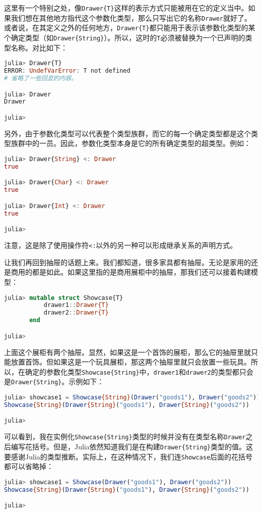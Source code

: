 这里有一个特别之处，像\verb`Drawer{T}`这样的表示方式只能被用在它的定义当中。如果我们想在其他地方指代这个参数化类型，那么只写出它的名称\verb`Drawer`就好了。或者说，在其定义之外的任何地方，\verb`Drawer{T}`都只能用于表示该参数化类型的某个确定类型（如\verb`Drawer{String}`）。所以，这时的\verb`T`必须被替换为一个已声明的类型名称。对比如下：
\begin{lstlisting}[language=julia]
julia> Drawer{T} 
ERROR: UndefVarError: T not defined
# 省略了一些回显的内容。

julia> Drawer
Drawer

julia> 
\end{lstlisting}

另外，由于参数化类型可以代表整个类型族群，而它的每一个确定类型都是这个类型族群中的一员。因此，参数化类型本身是它的所有确定类型的超类型。例如：
\begin{lstlisting}[language=julia]
julia> Drawer{String} <: Drawer
true

julia> Drawer{Char} <: Drawer
true

julia> Drawer{Int} <: Drawer
true

julia> 
\end{lstlisting}

注意，这是除了使用操作符\verb`<:`以外的另一种可以形成继承关系的声明方式。

让我们再回到抽屉的话题上来。我们都知道，很多家具都有抽屉。无论是家用的还是商用的都是如此。如果这里指的是商用展柜中的抽屉，那我们还可以接着构建模型：
\begin{lstlisting}[language=julia]
julia> mutable struct Showcase{T}
           drawer1::Drawer{T}
           drawer2::Drawer{T}
       end

julia> 
\end{lstlisting}

上面这个展柜有两个抽屉。显然，如果这是一个首饰的展柜，那么它的抽屉里就只能放置首饰。但如果这是一个玩具展柜，那这两个抽屉里就只会放置一些玩具。所以，在确定的参数化类型\verb`Showcase{String}`中，\verb`drawer1`和\verb`drawer2`的类型都只会是\verb`Drawer{String}`。示例如下：
\begin{lstlisting}[language=julia]
julia> showcase1 = Showcase{String}(Drawer("goods1"), Drawer("goods2"))
Showcase{String}(Drawer{String}("goods1"), Drawer{String}("goods2"))

julia> 
\end{lstlisting}

可以看到，我在实例化\verb`Showcase{String}`类型的时候并没有在类型名称\verb`Drawer`之后编写花括号。但是，Julia依然知道我们是在构建\verb`Drawer{String}`类型的值。这要感谢Julia的类型推断。实际上，在这种情况下，我们连\verb`Showcase`后面的花括号都可以省略掉：
\begin{lstlisting}[language=julia]
julia> showcase1 = Showcase(Drawer("goods1"), Drawer("goods2"))
Showcase{String}(Drawer{String}("goods1"), Drawer{String}("goods2"))

julia> 
\end{lstlisting}

